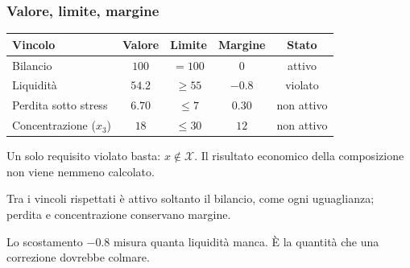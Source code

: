 \begin{frame}%
%

\frametitle{Valore, limite, margine}%
%

%


\begin{center}
{\small
\begin{tabular}
[c]{lcccc}\hline
\textbf{Vincolo} & \textbf{Valore} & \textbf{Limite} & \textbf{Margine} &
\textbf{Stato}\\\hline
Bilancio & $100$ & $=100$ & $0$ & attivo\\
Liquidit\`{a} & $54.2$ & $\geq55$ & $-0.8$ & violato\\
Perdita sotto stress & $6.70$ & $\leq7$ & $0.30$ & non attivo\\
Concentrazione ($x_{3}$) & $18$ & $\leq30$ & $12$ & non attivo\\\hline
\end{tabular}
}
\end{center}

\medskip

\begin{stepitemize}
\item Un solo requisito violato basta: $x\notin\mathcal{X}$. Il risultato
economico della composizione non viene nemmeno calcolato.

\item Tra i vincoli rispettati \`e attivo soltanto il bilancio, come ogni
uguaglianza; perdita e concentrazione conservano margine.

\item Lo scostamento $-0.8$ misura quanta liquidit\`{a} manca. \`{E} la
quantit\`{a} che una correzione dovrebbe colmare.
\end{stepitemize}

%

\transboxout
\end{frame}%




